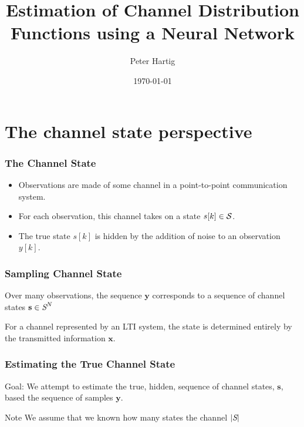 \documentclass[10pt,tgadventor, onlymath]{beamer}
\title{\large \bfseries Estimation of Channel Distribution Functions using a Neural Network}
\author{Peter Hartig\\[3ex]
}
\date{\today}
\begin{document}
\frame{
\thispagestyle{empty}
\titlepage
}

\frame{
\tableofcontents
}

\section{The channel state perspective}

\begin{frame}
\frametitle{The Channel State}
\begin{itemize}
\item 
	Observations are made of some channel in a point-to-point communication system.
\item 
	For each observation, this channel takes on a state $s[k]\in \cal{S}$. 
\item 
	The true state $s[k]$ is hidden by the addition of noise to an observation $y[k]$.
\end{itemize}
\end{frame}
\begin{frame}

\frametitle{Sampling Channel State}
Over many observations, the sequence $\mathbf{y}$ corresponds to a sequence of channel states $\mathbf{s}\in\textit{\cal{S}}^N$
\begin{figure}[H]
\begin{center}
\end{center}
\end{figure}
\pause
For a channel represented by an LTI system, the state is determined entirely by the transmitted information $\mathbf{x}$.
\end{frame}

\begin{frame}
\frametitle{Estimating the True Channel State}
\begin{block}{Goal:}
We attempt to estimate the true, hidden, sequence of channel states, $\mathbf{s}$, based the sequence of samples $\mathbf{y}$.
\end{block}

\begin{block}{Note}
We assume that we known how many states the channel $|\textit{\cal{S}}|$
\end{block}

\end{frame}
\end{document}
